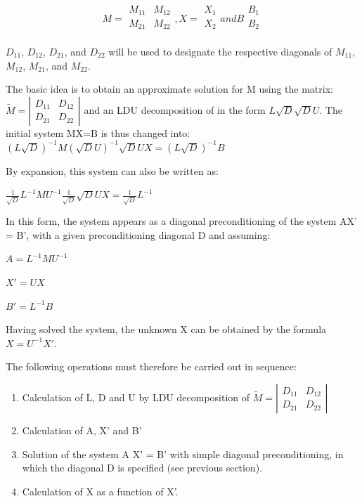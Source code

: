 \[M =
\begin{array}{|cc|}
  M_{11} & M_{12} \\
  M_{21} & M_{22} \\
\end{array}
, X =
\begin{array}{|c|}
  X_{1} \\
  X_{2} \\
\end{array}
and B
\begin{array}{|c|}
  B_{1} \\
  B_{2} \\
\end{array}
\]

$D_{11}$, $D_{12}$, $D_{21}$, and $D_{22}$ will be used to designate the
respective diagonals of $M_{11}$, $M_{12}$, $M_{21}$, and $M_{22}$.



The basic idea is to obtain an approximate solution for M using the matrix:
$\tilde{M} =
\left|\begin{array}{cc}
  {D_{11} } & {D_{12} } \\
  {D_{21} } & {D_{22}
} \end{array}\right|$
and an LDU decomposition of  in the form $L\sqrt{D} \sqrt{D} U$. The initial
system MX=B is thus changed into:
$\left(L\sqrt{D} \right)^{-1} M\left(\sqrt{D}  U\right)^{-1} \sqrt{D}  U
X=\left(L\sqrt{D} \right)^{-1}  B$

By expansion, this system can also be written as:

$\frac{1}{\sqrt{D}} L^{-1}MU^{-1} \frac{1}{\sqrt{D}} \sqrt{D} UX = \frac{1}{\sqrt{D}} L^{-1}$

In this form, the system appears as a diagonal preconditioning of the system
AX' = B', with a given preconditioning diagonal D and assuming:

$A = L^{-1} M U^{-1}$

$X' = U X$

$B' = L^{-1} B$

Having solved the system, the unknown X can be obtained by the formula $X =
U^{-1} X'$.

The following operations must therefore be carried out in sequence:
\begin{enumerate}
  \item Calculation of L, D and U by LDU decomposition of
  $\tilde{M}=\left|\begin{array}{cc} {D_{11} } & {D_{12} } \\ {D_{21} } &
  {D_{22} } \end{array}\right|$
  \item Calculation of A, X' and B'
  \item Solution of the system A X' = B' with simple diagonal preconditioning,
    in which the diagonal D is specified (see previous section).
  \item Calculation of X as a function of X'.
\end{enumerate}

